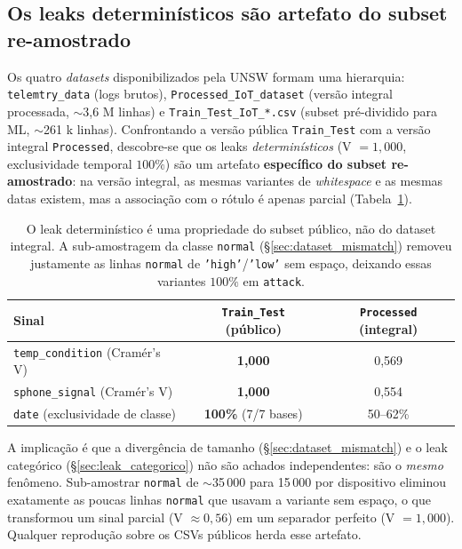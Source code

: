 \subsection{Os leaks determinísticos são artefato do subset re-amostrado}
\label{sec:leak_artifact}

Os quatro \emph{datasets} disponibilizados pela UNSW formam uma
hierarquia: \texttt{telemtry\_data} (logs brutos),
\texttt{Processed\_IoT\_dataset} (versão integral processada,
$\sim$3{,}6 M linhas) e \texttt{Train\_Test\_IoT\_*.csv} (subset
pré-dividido para ML, $\sim$261 k linhas). Confrontando a versão pública
\texttt{Train\_Test} com a versão integral \texttt{Processed}, descobre-se
que os leaks \emph{determinísticos} (V $=1{,}000$, exclusividade
temporal $100\%$) são um artefato \textbf{específico do subset
re-amostrado}: na versão integral, as mesmas variantes de
\emph{whitespace} e as mesmas datas existem, mas a associação com o
rótulo é apenas parcial (Tabela~\ref{tab:leak_subset}).

\begin{table}[ht]
  \centering
  \caption{O leak determinístico é uma propriedade do subset público,
           não do dataset integral. A sub-amostragem da classe
           \texttt{normal} (\S{}\ref{sec:dataset_mismatch}) removeu
           justamente as linhas \texttt{normal} de \texttt{'high'}/\texttt{'low'}
           sem espaço, deixando essas variantes $100\%$ em \texttt{attack}.}
  \label{tab:leak_subset}
  \small
  \begin{tabular}{lcc}
    \toprule
    \textbf{Sinal} & \textbf{\texttt{Train\_Test} (público)} & \textbf{\texttt{Processed} (integral)} \\
    \midrule
    \texttt{temp\_condition} (Cramér's V)  & \textbf{1{,}000} & 0{,}569 \\
    \texttt{sphone\_signal} (Cramér's V)   & \textbf{1{,}000} & 0{,}554 \\
    \texttt{date} (exclusividade de classe) & \textbf{100\%} (7/7 bases) & 50--62\% \\
    \bottomrule
  \end{tabular}
\end{table}

A implicação é que a divergência de tamanho
(\S{}\ref{sec:dataset_mismatch}) e o leak categórico
(\S{}\ref{sec:leak_categorico}) não são achados independentes: são o
\emph{mesmo} fenômeno. Sub-amostrar \texttt{normal} de
$\sim$35\,000 para 15\,000 por dispositivo eliminou exatamente as
poucas linhas \texttt{normal} que usavam a variante sem espaço, o que
transformou um sinal parcial (V $\approx 0{,}56$) em um separador
perfeito (V $=1{,}000$). Qualquer reprodução sobre os CSVs públicos
herda esse artefato.

